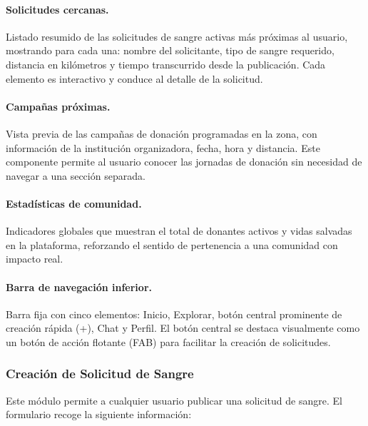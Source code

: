 \documentclass[12pt, a4paper]{article}
\begin{document}
\paragraph{Solicitudes cercanas.}
Listado resumido de las solicitudes de sangre activas más próximas al usuario, mostrando para cada una: nombre del solicitante, tipo de sangre requerido, distancia en kilómetros y tiempo transcurrido desde la publicación. Cada elemento es interactivo y conduce al detalle de la solicitud.

\paragraph{Campañas próximas.}
Vista previa de las campañas de donación programadas en la zona, con información de la institución organizadora, fecha, hora y distancia. Este componente permite al usuario conocer las jornadas de donación sin necesidad de navegar a una sección separada.

\paragraph{Estadísticas de comunidad.}
Indicadores globales que muestran el total de donantes activos y vidas salvadas en la plataforma, reforzando el sentido de pertenencia a una comunidad con impacto real.

\paragraph{Barra de navegación inferior.}
Barra fija con cinco elementos: Inicio, Explorar, botón central prominente de creación rápida (+), Chat y Perfil. El botón central se destaca visualmente como un botón de acción flotante (FAB) para facilitar la creación de solicitudes.

\subsubsection{Creación de Solicitud de Sangre}

Este módulo permite a cualquier usuario publicar una solicitud de sangre. El formulario recoge la siguiente información:
\end{document}
